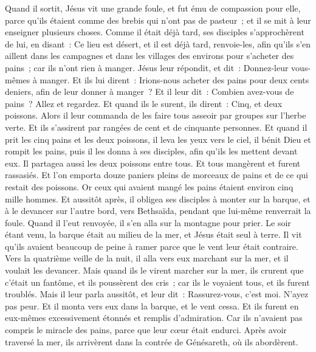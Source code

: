 \begin{multicols}{2}
Quand il sortit, Jésus vit une grande foule, et fut ému de compassion pour elle, parce qu'ils étaient comme des brebis qui n'ont pas de pasteur~; et il se mit à leur enseigner plusieurs choses.
Comme il était déjà tard, ses disciples s'approchèrent de lui, en disant~: Ce lieu est désert, et il est déjà tard,
renvoie-les, afin qu'ils s'en aillent dans les campagnes et dans les villages des environs pour s'acheter des pains~; car ils n'ont rien à manger.
Jésus leur répondit, et dit~: Donnez-leur vous-mêmes à manger. Et ils lui dirent~: Irions-nous acheter des pains pour deux cents deniers, afin de leur donner à manger~?
Et il leur dit~: Combien avez-vous de pains~? Allez et regardez. Et quand ils le surent, ils dirent~: Cinq, et deux poissons.
Alors il leur commanda de les faire tous asseoir par groupes sur l'herbe verte.
Et ils s'assirent par rangées de cent et de cinquante personnes.
Et quand il prit les cinq pains et les deux poissons, il leva les yeux vers le ciel, il bénit Dieu et rompit les pains, puis il les donna à ses disciples, afin qu'ils les mettent devant eux. Il partagea aussi les deux poissons entre tous.
Et tous mangèrent et furent rassasiés.
Et l'on emporta douze paniers pleins de morceaux de pains et de ce qui restait des poissons.
Or ceux qui avaient mangé les pains étaient environ cinq mille hommes.
Et aussitôt après, il obligea ses disciples à monter sur la barque, et à le devancer sur l'autre bord, vers Bethsaïda, pendant que lui-même renverrait la foule.
Quand il l'eut renvoyée, il s'en alla sur la montagne pour prier.
Le soir étant venu, la barque était au milieu de la mer, et Jésus était seul à terre.
Il vit qu'ils avaient beaucoup de peine à ramer parce que le vent leur était contraire. Vers la quatrième veille de la nuit, il alla vers eux marchant sur la mer, et il voulait les devancer.
Mais quand ils le virent marcher sur la mer, ils crurent que c'était un fantôme, et ils poussèrent des cris~;
car ils le voyaient tous, et ils furent troublés. Mais il leur parla aussitôt, et leur dit~: Rassurez-vous, c'est moi. N'ayez pas peur.
Et il monta vers eux dans la barque, et le vent cessa. Et ils furent en eux-mêmes excessivement étonnés et remplis d'admiration.
Car ils n'avaient pas compris le miracle des pains, parce que leur cœur était endurci.
Après avoir traversé la mer, ils arrivèrent dans la contrée de Génésareth, où ils abordèrent.

\end{multicols}
